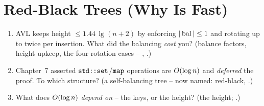 \section{Red-Black Trees (Why  Is Fast)}\label{sec:c06-redblack}

\begin{previouslybox}
\begin{enumerate}[nosep, leftmargin=1.6em]
  \item AVL keeps height $\le 1.44\,\lg(n+2)$ by enforcing $|\operatorname{bal}|\le 1$ and rotating up to twice per
        insertion. What did the balancing \emph{cost} you? (balance factors, height upkeep, the four
        rotation cases -- , .)
  \item Chapter~7 asserted $\texttt{std::set}$/$\texttt{map}$ operations are $O(\log n)$ and \emph{deferred}
        the proof. To which structure? (a self-balancing tree -- now named: red-black,
        .)
  \item What does $O(\log n)$ \emph{depend on} -- the keys, or the height? (the height;
        .)
\end{enumerate}
\end{previouslybox}

